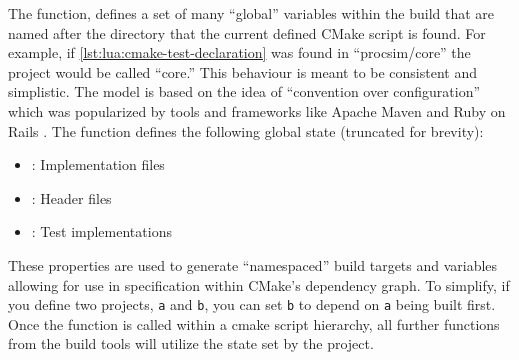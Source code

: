 The function,  defines a set of many ``global'' variables within the build that are named after the directory that the current defined CMake script is found. For example, if \cref{lst:lua:cmake-test-declaration} was found in ``procsim/core'' the project would be called ``core.'' This behaviour is meant to be consistent and simplistic. The model is based on the idea of ``convention over configuration'' which was popularized by tools and frameworks like Apache Maven \cite{Maven:StandardDirectoryLayout} and Ruby on Rails \cite{Heinemeier:RailsDoctrine}. The function defines the following global state (truncated for brevity): 
\begin{itemize}
    \item {}: Implementation files
    \item {}: Header files
    \item {}: Test implementations
\end{itemize}
These properties are used to generate ``namespaced'' build targets and variables allowing for use in specification within CMake's dependency graph. To simplify, if you define two projects, \verb|a| and \verb|b|, you can set \verb|b| to depend on \verb|a| being built first. Once the  function is called within a cmake script hierarchy, all further functions from the build tools will utilize the state set by the project. 

